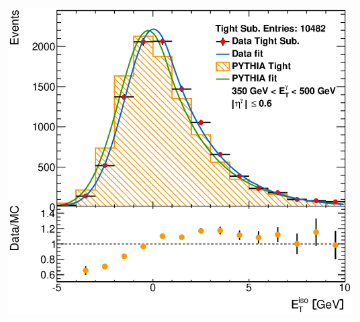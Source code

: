 \documentclass[12pt, twoside]{article}
\numberwithin{equation}{section}
\numberwithin{figure}{section}
\newenvironment{changemargin}[2]{%
\begin{list}{}{%
\setlength{\topsep}{0pt}%
\setlength{\leftmargin}{#1}%
\setlength{\rightmargin}{#2}%
\setlength{\listparindent}{\parindent}%
\setlength{\itemindent}{\parindent}%
\setlength{\parsep}{\parskip}%
}%
\item[]}{\end{list}}
\begin{document}
\begin{figure}[H]
\begin{changemargin}{-1.0cm}{-0.75cm}
\begin{changemargin}{-0.75cm}{-1.0cm}
\begin{subfigure}[b]{0.27\textwidth}
            \includegraphics[width=\textwidth]{./images/EtISOCorrection/T_MC_FITS-14(10GeV)(Before).eps}
        \end{subfigure}


\end{changemargin}
\end{changemargin}
\end{figure}
\end{document}
